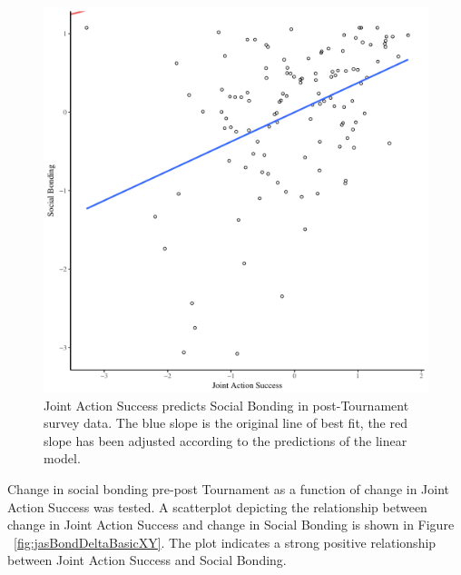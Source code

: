   \begin{figure}[htbp]
    \centering
  \includegraphics[scale=.5]{images/jasBondModelSlope.pdf}
    \caption{Joint Action Success predicts Social Bonding in post-Tournament survey data. The blue slope is the original line of best fit, the red slope has been adjusted according to the predictions of the linear model.}
    \label{fig:jasBondModelSlope}
  \end{figure}








Change in social bonding pre-post Tournament as a function of change in Joint Action Success was tested. A scatterplot depicting the relationship between change in Joint Action Success and change in Social Bonding is shown in Figure ~\ref{fig:jasBondDeltaBasicXY}. The plot indicates a strong positive relationship between Joint Action Success and Social Bonding.

